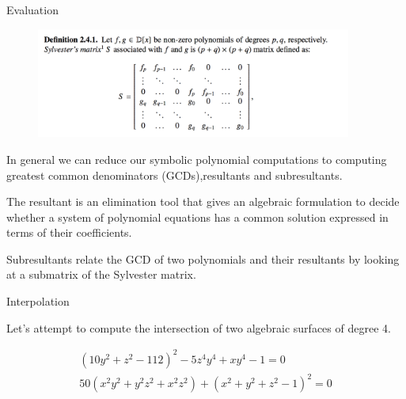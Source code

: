 \documentclass{beamer}
\begin{document}
	\begin{frame}{Evaluation}
		
			\begin{figure}[!ht]
				\centering
				\includegraphics[width=0.925\textwidth,scale=0.5]{../Code/Images/sylv_matrix.png}
			\end{figure}
			
		
		In general we can reduce our symbolic polynomial computations to computing greatest common denominators (GCDs),resultants and subresultants.
		\vspace{0.2in}
		
		The resultant is an elimination tool that gives an algebraic formulation to decide whether a system of polynomial equations has a common solution expressed in terms of their coefficients.
		\vspace{0.2in}
			
		Subresultants relate the GCD of two polynomials and their resultants by looking at a submatrix of the Sylvester matrix.
		
		\vspace{0.2in}
		
	
		
		
		
		
	\end{frame}
	
	\begin{frame}{Interpolation}
	
		
		Let's attempt to compute the intersection of two algebraic surfaces of degree 4.
		
		\begin{align*}
			(10y^2 + z^2 - 112)^2 - 5z^4y^4 + xy^4 - 1 = 0 \\
			50(x^2y^2 + y^2z^2 + x^2z^2) + (x^2 + y^2 + z^2 -1)^2 = 0
		\end{align*}
	
	
		
	\end{frame}
	
\end{document}
